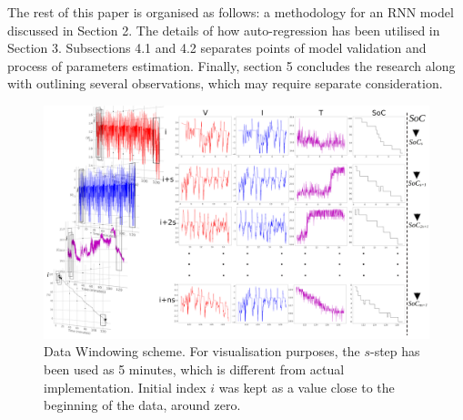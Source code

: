 %
%
The rest of this paper is organised as follows: a methodology for an RNN model discussed in Section 2.
The details of how auto-regression has been utilised in Section 3.
Subsections 4.1 and 4.2 separates points of model validation and process of parameters estimation.
Finally, section 5 concludes the research along with outlining several observations, which may require separate consideration.
\begin{landscape}
    \begin{figure}[ht]
        \centering
        \includegraphics[width=0.9\linewidth]{II_Body/images/Windowing3D-1.jpg}
        \caption{Data Windowing scheme. For visualisation purposes, the $s$-step has been used as 5 minutes, which is different from actual implementation. Initial index $i$ was kept as a value close to the beginning of the data, around zero.}
        \label{fig:Windowing}
    \end{figure}
\end{landscape}